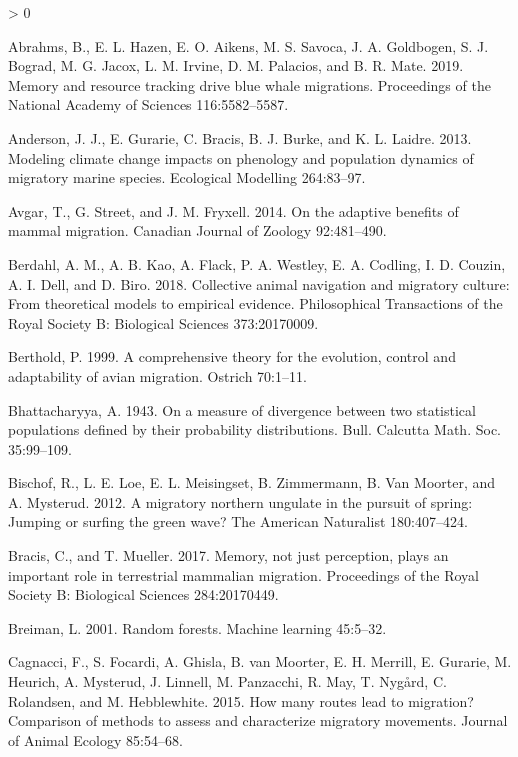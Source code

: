 \documentclass[12pt]{article}
\newlength{\cslhangindent}
\newenvironment{CSLReferences}[2] %
 {%
  \setlength{\parindent}{0pt}
  \ifodd #1 \everypar{\setlength{\hangindent}{\cslhangindent}}\ignorespaces\fi
  \ifnum #2 > 0
  \setlength{\parskip}{#2\baselineskip}
  \fi
 }%
 {}
\begin{document}
\hypertarget{refs}{}
\begin{CSLReferences}{1}{0}
\leavevmode\hypertarget{ref-Abrahms2019}{}%
Abrahms, B., E. L. Hazen, E. O. Aikens, M. S. Savoca, J. A. Goldbogen,
S. J. Bograd, M. G. Jacox, L. M. Irvine, D. M. Palacios, and B. R. Mate.
2019. Memory and resource tracking drive blue whale migrations.
Proceedings of the National Academy of Sciences 116:5582--5587.

\leavevmode\hypertarget{ref-Anderson2013}{}%
Anderson, J. J., E. Gurarie, C. Bracis, B. J. Burke, and K. L. Laidre.
2013. Modeling climate change impacts on phenology and population
dynamics of migratory marine species. Ecological Modelling 264:83--97.

\leavevmode\hypertarget{ref-Avgar2014}{}%
Avgar, T., G. Street, and J. M. Fryxell. 2014. On the adaptive benefits
of mammal migration. Canadian Journal of Zoology 92:481--490.

\leavevmode\hypertarget{ref-Berdahl2018}{}%
Berdahl, A. M., A. B. Kao, A. Flack, P. A. Westley, E. A. Codling, I. D.
Couzin, A. I. Dell, and D. Biro. 2018. Collective animal navigation and
migratory culture: From theoretical models to empirical evidence.
Philosophical Transactions of the Royal Society B: Biological Sciences
373:20170009.

\leavevmode\hypertarget{ref-Berthold1999}{}%
Berthold, P. 1999. A comprehensive theory for the evolution, control and
adaptability of avian migration. Ostrich 70:1--11.

\leavevmode\hypertarget{ref-Bhattacharyya1943}{}%
Bhattacharyya, A. 1943. On a measure of divergence between two
statistical populations defined by their probability distributions.
Bull. Calcutta Math. Soc. 35:99--109.

\leavevmode\hypertarget{ref-Bischof2012}{}%
Bischof, R., L. E. Loe, E. L. Meisingset, B. Zimmermann, B. Van Moorter,
and A. Mysterud. 2012. A migratory northern ungulate in the pursuit of
spring: Jumping or surfing the green wave? The American Naturalist
180:407--424.

\leavevmode\hypertarget{ref-Bracis2017}{}%
Bracis, C., and T. Mueller. 2017. Memory, not just perception, plays an
important role in terrestrial mammalian migration. Proceedings of the
Royal Society B: Biological Sciences 284:20170449.

\leavevmode\hypertarget{ref-Breiman2001}{}%
Breiman, L. 2001. Random forests. Machine learning 45:5--32.

\leavevmode\hypertarget{ref-Cagnacci2015}{}%
Cagnacci, F., S. Focardi, A. Ghisla, B. van Moorter, E. H. Merrill, E.
Gurarie, M. Heurich, A. Mysterud, J. Linnell, M. Panzacchi, R. May, T.
Nygård, C. Rolandsen, and M. Hebblewhite. 2015. How many routes lead to
migration? Comparison of methods to assess and characterize migratory
movements. Journal of Animal Ecology 85:54--68.


\end{CSLReferences}
\end{document}
